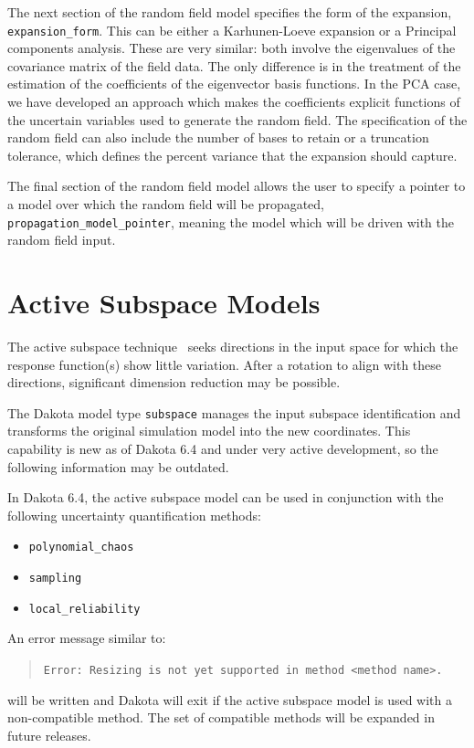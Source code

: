 The next section of the random field model specifies the form of the expansion,
\texttt{expansion\_form}.  This can be either a Karhunen-Loeve expansion or a
Principal components analysis.  These are very similar:  both involve the eigenvalues
of the covariance matrix of the field data.  The only difference is in the treatment
of the estimation of the coefficients of the eigenvector basis functions.  In the
PCA case, we have developed an approach which makes the coefficients explicit
functions of the uncertain variables used to generate the random field.
The specification of the random field can also include the number of bases
to retain or a truncation tolerance, which defines the percent variance
that the expansion should capture.

The final section of the random field model allows the user to specify
a pointer to a model over which the random field will be propagated, 
\texttt{propagation\_model\_pointer},
meaning the model which will be driven with the random field input.


\section{Active Subspace Models} \label{models:subspace} 

The active subspace technique~\cite{constantine2015active} seeks
directions in the input space for which the response function(s) show
little variation. After a rotation to align with these directions,
significant dimension reduction may be possible. 

The Dakota model type \texttt{subspace} manages the input subspace
identification and transforms the original simulation model into the
new coordinates.  This capability is new as of Dakota 6.4 and under
very active development, so the following information may be outdated.

In Dakota 6.4, the active subspace model can be used in conjunction
with the following uncertainty quantification methods:
\begin{itemize}
\item \texttt{polynomial\_chaos}
\item \texttt{sampling}
\item \texttt{local\_reliability}
\end{itemize}
An error message similar to:
\begin{quote}
\texttt{Error: Resizing is not yet supported in method <method name>.}
\end{quote}
will be written and Dakota will exit if the active subspace model is
used with a non-compatible method. The set of compatible methods will
be expanded in future releases.

